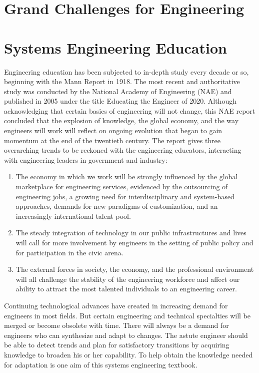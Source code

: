 
\section{Grand Challenges for Engineering}


\section{Systems Engineering Education}

Engineering education has been subjected to in-depth study every decade or so, beginning with the Mann Report in 1918. The most recent and authoritative study was conducted by the National Academy of Engineering (NAE) and published in 2005 under the title Educating the Engineer of 2020.
Although acknowledging that certain basics of engineering will not change, this NAE report concluded that the explosion of knowledge, the global economy, and the way engineers will work will reflect on ongoing evolution that began to gain momentum at the end of the twentieth century. The report gives three overarching trends to be reckoned with the engineering educators, interacting with engineering leaders in government and industry:

\begin{enumerate}
\item The economy in which we work will be strongly influenced by the global marketplace for engineering services, evidenced by the outsourcing of engineering jobs, a growing need for interdisciplinary and system-based approaches, demands for new paradigms of customization, and an increasingly international talent pool.
\item The steady integration of technology in our public infrastructures and lives will call for more involvement by engineers in the setting of public policy and for participation in the civic arena.
\item The external forces in society, the economy, and the professional environment will all challenge the stability of the engineering workforce and affect our ability to attract the most talented individuals to an engineering career.
\end{enumerate}

Continuing technological advances have created in increasing demand for engineers in most fields. But certain engineering and technical specialties will be merged or become obsolete with time. There will always be a demand for engineers who can synthesize and adapt to changes. The astute engineer should be able to detect trends and plan for satisfactory transitions by acquiring knowledge to broaden his or her capability. To help obtain the knowledge needed for adaptation is one aim of this systems engineering textbook.


